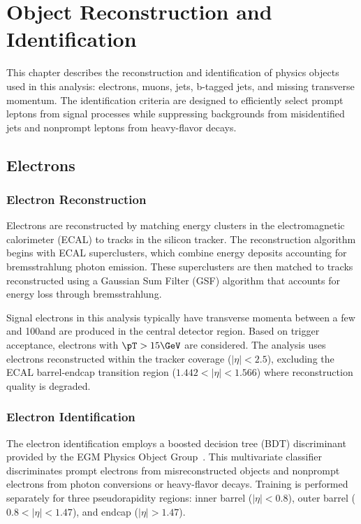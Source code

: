 \chapter{Object Reconstruction and Identification}
\label{ch:objects}

This chapter describes the reconstruction and identification of physics objects used in this analysis: electrons, muons, jets, b-tagged jets, and missing transverse momentum. The identification criteria are designed to efficiently select prompt leptons from signal processes while suppressing backgrounds from misidentified jets and nonprompt leptons from heavy-flavor decays.

\section{Electrons}
\label{sec:electron_id}

\subsection{Electron Reconstruction}

Electrons are reconstructed by matching energy clusters in the electromagnetic calorimeter (ECAL) to tracks in the silicon tracker. The reconstruction algorithm begins with ECAL superclusters, which combine energy deposits accounting for bremsstrahlung photon emission. These superclusters are then matched to tracks reconstructed using a Gaussian Sum Filter (GSF) algorithm that accounts for energy loss through bremsstrahlung.

Signal electrons in this analysis typically have transverse momenta between a few \GeV and 100\GeV and are produced in the central detector region. Based on trigger acceptance, electrons with $\pT > 15\GeV$ are considered. The analysis uses electrons reconstructed within the tracker coverage ($|\eta| < 2.5$), excluding the ECAL barrel-endcap transition region ($1.442 < |\eta| < 1.566$) where reconstruction quality is degraded.

\subsection{Electron Identification}

The electron identification employs a boosted decision tree (BDT) discriminant provided by the EGM Physics Object Group~\cite{EGMPOGMVAID}. This multivariate classifier discriminates prompt electrons from misreconstructed objects and nonprompt electrons from photon conversions or heavy-flavor decays. Training is performed separately for three pseudorapidity regions: inner barrel ($|\eta| < 0.8$), outer barrel ($0.8 < |\eta| < 1.47$), and endcap ($|\eta| > 1.47$).

